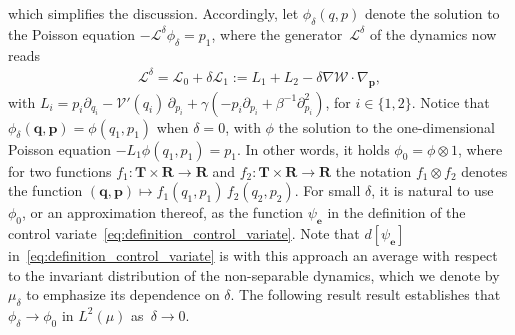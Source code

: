 \documentclass[11pt,a4paper]{article}
\newcommand{\real}{\mathbf R}
\newcommand{\torus}{\mathbf T}
\newcommand{\grad}{\nabla}
\newcommand{\vect}[1]{\boldsymbol{\mathbf #1}}
\renewcommand{\d}{\mathrm d}
\theoremstyle{plain}
\numberwithin{equation}{section}
\begin{document}
which simplifies the discussion.
Accordingly, let $\phi_\delta(q, p)$ denote the solution to the Poisson equation $- \mathcal L^{\delta} \phi_\delta = p_1$,
where the generator~$\mathcal L^{\delta}$ of the dynamics now reads
\begin{align}
    \label{eq:generator}
    \mathcal L^{\delta} = \mathcal L_0 + \delta \mathcal L_1
    := L_1 + L_2
    - \delta \grad \mathcal W \cdot \grad_{\vect p},
\end{align}
with $L_i = p_i \partial_{q_i} - \mathcal V'(q_i) \, \partial_{p_i} + \gamma \left(- p_i \partial_{p_i} + \beta^{-1} \partial^2_{p_i} \right)$,
for $i \in \{1, 2\}$.
Notice that $\phi_\delta(\vect q, \vect p) = \phi(q_1, p_1)$ when $\delta = 0$,
with $\phi$ the solution to the one-dimensional Poisson equation $-L_1 \phi(q_1, p_1) = p_1$.
In other words, it holds $\phi_0 = \phi \otimes 1$,
where for two functions $f_1: \torus \times \real \rightarrow \real$ and $f_2: \torus \times \real \rightarrow \real$
the notation $f_1 \otimes f_2$ denotes the function $(\vect q, \vect p) \mapsto f_1(q_1,p_1) \, f_2(q_2,p_2)$.
For small $\delta$, it is natural to use $\phi_0$, or an approximation thereof,
as the function $\psi_{\vect e}$ in the definition of the control variate~\eqref{eq:definition_control_variate}.
Note that $d[\psi_{\vect e}]$ in~\eqref{eq:definition_control_variate} is with this approach an average with respect to the invariant distribution of the non-separable dynamics,
which we denote by $\mu_{\delta}$ to emphasize its dependence on $\delta$.
The following result result establishes that~$\phi_\delta \to \phi_0$ in $L^2(\mu)$ as~$\delta \to 0$.
\end{document}
